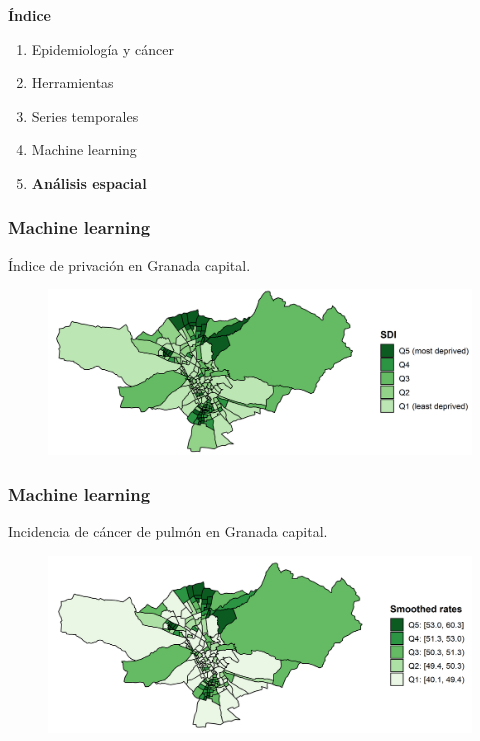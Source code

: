 \documentclass{beamer}
\begin{document}
\begin{frame}\frametitle{}
	
	\Large{\textbf{Índice}}\\[2ex]
	\normalsize
	\begin{enumerate}
		\item Epidemiología y cáncer\\[2ex]
		\item Herramientas\\[2ex]
		\item Series temporales \\[2ex]
		\item Machine learning \\[2ex]
		\item \textbf{Análisis espacial} \\[2ex]
	\end{enumerate}
	
\end{frame}


\begin{frame}\frametitle{Machine learning}
	\centering Índice de privación en Granada capital.
	\begin{figure}
		\centering
		\includegraphics[width=.9\textwidth]{images/maps_DI_zoom.png}
	\end{figure}
\end{frame}


\begin{frame}\frametitle{Machine learning}

	\centering Incidencia de cáncer de pulmón en Granada capital.
	\begin{figure}
		\centering
		\includegraphics[width=.9\textwidth]{images/03_lung_ebs_zoom.png}
	\end{figure}
\end{frame}
\end{document}
